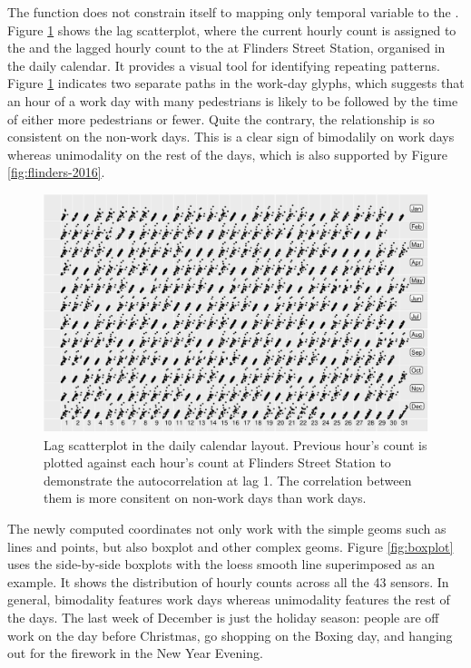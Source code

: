 \documentclass[article]{jss}
\begin{document}
The  function does not constrain itself to mapping
only temporal variable to the . Figure \ref{fig:scatterplot}
shows the lag scatterplot, where the current hourly count is assigned to
the  and the lagged hourly count to the  at Flinders
Street Station, organised in the daily calendar. It provides a visual
tool for identifying repeating patterns. Figure \ref{fig:scatterplot}
indicates two separate paths in the work-day glyphs, which suggests that
an hour of a work day with many pedestrians is likely to be followed by
the time of either more pedestrians or fewer. Quite the contrary, the
relationship is so consistent on the non-work days. This is a clear sign
of bimodalily on work days whereas unimodality on the rest of the days,
which is also supported by Figure \ref{fig:flinders-2016}.

\begin{CodeChunk}
\begin{figure}

{\centering \includegraphics[width=\textwidth]{figure/scatterplot-1} 

}

\caption[Lag scatterplot in the daily calendar layout]{Lag scatterplot in the daily calendar layout. Previous hour's count is plotted against each hour's count at Flinders Street Station to demonstrate the autocorrelation at lag 1. The correlation between them is more consitent on non-work days than work days.}\label{fig:scatterplot}
\end{figure}
\end{CodeChunk}

The newly computed coordinates not only work with the simple geoms such
as lines and points, but also boxplot and other complex geoms. Figure
\ref{fig:boxplot} uses the side-by-side boxplots with the loess smooth
line superimposed as an example. It shows the distribution of hourly
counts across all the 43 sensors. In general, bimodality features work
days whereas unimodality features the rest of the days. The last week of
December is just the holiday season: people are off work on the day
before Christmas, go shopping on the Boxing day, and hanging out for the
firework in the New Year Evening.
\end{document}

